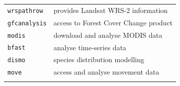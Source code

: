 \documentclass[10pt,landscape]{article}
\begin{document}
\begin{multicols}{3}
\begin{tabular}{@{}ll@{}}
\verb!wrspathrow!  & provides Landsat WRS-2 information\\
\verb!gfcanalysis!  & access to Forest Cover Change product\\

\verb!modis!  & download and analyse MODIS data\\
\verb!bfast!  & analyse time-series data\\

\verb!dismo!  &  species distribution modelling \\
\verb!move!  & access and analyse movement data\\

& \\
\end{tabular}


\end{multicols}
\end{document}
